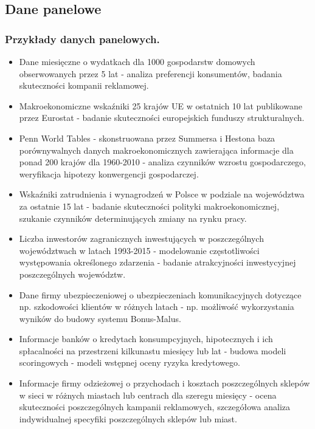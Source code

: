 \subsection{Dane panelowe}
\subsubsection{Przykłady danych panelowych.}
\begin{itemize}
\item Dane miesięczne o wydatkach dla 1000 gospodarstw domowych obserwowanych przez 5 lat - analiza preferencji konsumentów, badania skuteczności kompanii reklamowej.
\item Makroekonomiczne wskaźniki 25 krajów UE w ostatnich 10 lat publikowane przez Eurostat - badanie skuteczności europejskich funduszy strukturalnych.
\item Penn World Tables - skonstruowana przez Summersa i Hestona baza porównywalnych danych makroekonomicznych zawierająca informacje dla ponad 200 krajów dla 1960-2010 - analiza czynników wzrostu gospodarczego, weryfikacja hipotezy konwergencji gospodarczej.
\item Wskaźniki zatrudnienia i wynagrodzeń w Polsce w podziale na województwa za ostatnie 15 lat - badanie skuteczności polityki makroekonomicznej, szukanie czynników determinujących zmiany na rynku pracy.
\item Liczba inwestorów zagranicznych inwestujących w poszczególnych województwach w latach 1993-2015 - modelowanie częstotliwości występowania określonego zdarzenia - badanie atrakcyjności inwestycyjnej poszczególnych województw.
\item Dane firmy ubezpieczeniowej o ubezpieczeniach komunikacyjnych dotyczące np. szkodowości klientów w różnych latach - np. możliwość wykorzystania wyników do budowy systemu Bonus-Malus.
\item Informacje banków o kredytach konsumpcyjnych, hipotecznych i ich spłacalności na przestrzeni kilkunastu miesięcy lub lat - budowa modeli scoringowych - modeli wstępnej oceny ryzyka kredytowego.
\item Informacje firmy odzieżowej o przychodach i kosztach poszczególnych sklepów w sieci w różnych miastach lub centrach dla szeregu miesięcy - ocena skuteczności poszczególnych kampanii reklamowych, szczegółowa analiza indywidualnej specyfiki poszczególnych sklepów lub miast.
\end{itemize}
